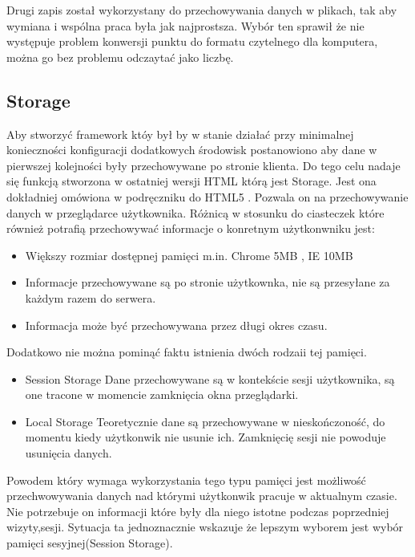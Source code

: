 Drugi zapis został wykorzystany do przechowywania danych w plikach, tak aby wymiana i wspólna praca była jak najprostsza. Wybór ten sprawił że nie występuje problem konwersji punktu do formatu czytelnego dla komputera, można go bez problemu odczaytać jako liczbę.

\subsection{Storage}
\label{subsec:storage5}
Aby stworzyć framework któy był by w stanie działać przy minimalnej konieczności konfiguracji dodatkowych środowisk postanowiono aby dane w pierwszej kolejności były przechowywane po stronie klienta. Do tego celu nadaje się funkcją stworzona w ostatniej wersji HTML którą jest Storage. Jest ona dokładniej omówiona w podręczniku do HTML5  \cite{html5dive}. Pozwala on na przechowywanie danych w przeglądarce użytkownika. Różnicą w stosunku do ciasteczek które również potrafią przechowywać informacje o konretnym użytkonwniku jest:
\begin{itemize}
\item
Większy rozmiar dostępnej pamięci m.in. Chrome 5MB \nocite{chrome5mb}, IE 10MB
\item
Informacje przechowywane są po stronie użytkownka, nie są przesyłane za każdym razem do serwera.
\item
Informacja może być przechowywana przez długi okres czasu.
\end{itemize}



Dodatkowo nie można pominąć faktu istnienia dwóch rodzaii tej pamięci.
\begin{itemize}

\item
Session Storage
Dane przechowywane są w kontekście sesji użytkownika, są one tracone w momencie zamknięcia okna przeglądarki.

\item
Local Storage
Teoretycznie dane są przechowywane w nieskończoność, do momentu kiedy użytkonwik nie usunie ich. Zamknięcię sesji nie powoduje usunięcia danych.

\end{itemize}

Powodem który wymaga wykorzystania tego typu pamięci jest możliwość przechwowywania danych nad którymi użytkonwik pracuje w aktualnym czasie. Nie potrzebuje on informacji które były dla niego istotne podczas poprzedniej wizyty,sesji. Sytuacja ta jednoznacznie wskazuje że lepszym wyborem jest wybór pamięci sesyjnej(Session Storage).


